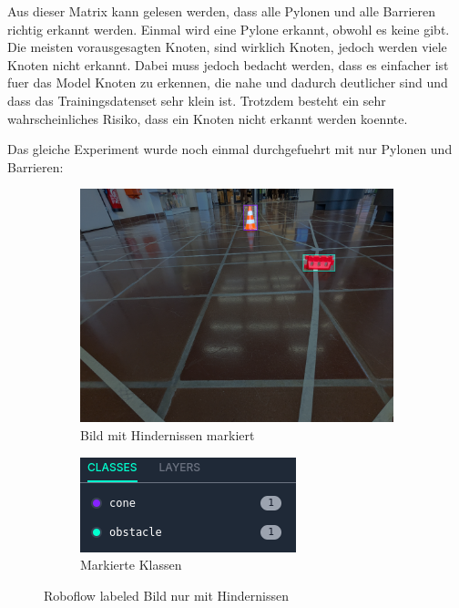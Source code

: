 Aus dieser Matrix kann gelesen werden, dass alle Pylonen und alle Barrieren richtig erkannt werden. Einmal wird eine Pylone erkannt, obwohl es keine gibt. Die meisten vorausgesagten Knoten, sind wirklich Knoten, jedoch werden viele Knoten nicht erkannt. Dabei muss jedoch bedacht werden, dass es einfacher ist fuer das Model Knoten zu erkennen, die nahe und dadurch deutlicher sind und dass das Trainingsdatenset sehr klein ist. Trotzdem besteht ein sehr wahrscheinliches Risiko, dass ein Knoten nicht erkannt werden koennte.

Das gleiche Experiment wurde noch einmal durchgefuehrt mit nur Pylonen und Barrieren:

\begin{figure}[H]
\begin{subfigure}{0.55\textwidth}
\includegraphics[width=0.95\linewidth]{assets/informatik-prototyp/yolo/label-cone-obstacle.png} 
\caption{Bild mit Hindernissen markiert}
\label{fig:labeled-image-obst}
\end{subfigure}
\begin{subfigure}{0.4\textwidth}
\includegraphics[width=0.95\linewidth]{assets/informatik-prototyp/yolo/classes-cone-obstacle.png} 
\caption{Markierte Klassen}
\label{fig:cone-obst-classes}
\end{subfigure}
\caption{Roboflow labeled Bild nur mit Hindernissen}
\label{fig:labeling-with-cone-obst}
\end{figure}


